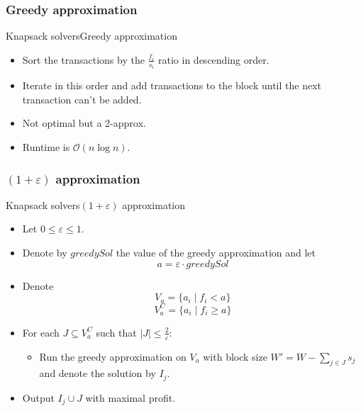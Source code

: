 \documentclass{beamer}
\begin{document}
\subsubsection*{Greedy approximation}

\begin{frame}{Knapsack solvers}{Greedy approximation}
    \begin{itemize}
        \item {Sort the transactions by the $\frac{f_i}{s_i}$ ratio in 
        descending order.}
        \item {Iterate in this order and add transactions to the block until
         the next transaction can't be added.}
        \item {Not optimal but a 2-approx.}
        \item {Runtime is $\mathcal{O}(n\log{n})$.}
    \end{itemize}
\end{frame}
\subsubsection*{$(1+\varepsilon)$ approximation}

\begin{frame}{Knapsack solvers}{$(1+\varepsilon)$ approximation} %
    \begin{itemize}
        \item {Let $0 \leq \varepsilon \leq 1$.}
        \item {Denote by $greedySol$ the value of the greedy approximation 
        and let $$ a = \varepsilon \cdot greedySol $$}
        \item {Denote $$ V_a = \{a_i \mid f_i < a\} $$  
        $$ V_a^C = \{a_i \mid f_i \geq a\} $$}
        \item {For each $J \subseteq V_a^C$ such that 
        $|J| \leq \frac{2}{\varepsilon}$:}
        \begin{itemize}
            \item {Run the greedy approximation on $V_a$ with block size 
            $W'=W-\sum_{j\in J} s_j$ and denote the solution by $I_j$.}
        \end{itemize}
        \item {Output $I_j \cup J$ with maximal profit.}
    \end{itemize}
\end{frame}
\end{document}
